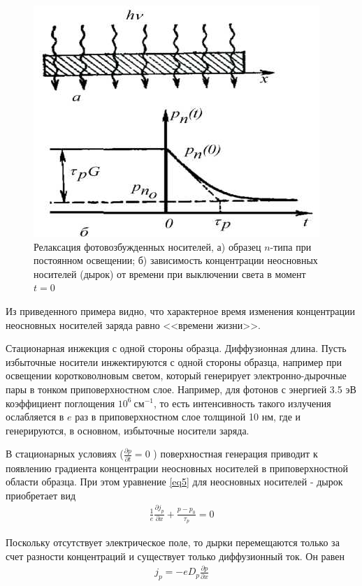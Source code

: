 \documentclass[a4paper,12pt]{article}
\begin{document}
\begin{figure}[H]
	\centering
	\includegraphics[]{7}
	\caption{Релаксация фотовозбужденных носителей, а) образец $n$-типа при постоянном освещении; б) зависимость концентрации неосновных носителей (дырок) от времени при выключении света в момент $t = 0$}
	\label{fig:figure6}
\end{figure}

Из приведенного примера видно, что характерное время изменения концентрации неосновных носителей заряда равно <<времени жизни>>.

Стационарная инжекция с одной стороны образца. Диффузионная длина. Пусть избыточные носители инжектируются с одной стороны образца, например при освещении коротковолновым светом, который генерирует электронно-дырочные пары в тонком приповерхностном слое. Например, для фотонов с энергией 3.5 эВ коэффициент поглощения $10^6\ \text{см}^{-1}$, то есть интенсивность такого излучения ослабляется в $e$ раз в приповерхностном слое толщиной 10 нм, где и генерируются, в основном, избыточные носители заряда.

В стационарных условиях ($\frac{\partial p}{\partial t}=0$ ) поверхностная генерация приводит к появлению градиента концентрации неосновных носителей в приповерхностной области образца. При этом уравнение \eqref{eq5} для неосновных носителей - дырок приобретает вид
\begin{gather}
	\label{eq13}
	\frac{1}{e} \frac{\partial j_{p}}{\partial x}+\frac{p-p_{0}}{\tau_{p}}=0
\end{gather}

Поскольку отсутствует электрическое поле, то дырки перемещаются только за счет разности концентраций и существует только диффузионный ток. Он равен
\begin{gather}
	\label{eq14}
	j_{p}=-e D_{p} \frac{\partial p}{\partial x}
\end{gather}
\end{document}
